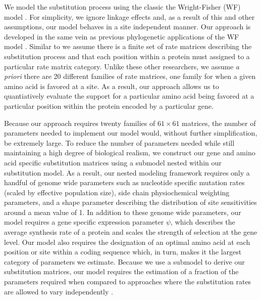\documentclass{article}
\begin{document}
We model the substitution process using the classic the Wright-Fisher (WF) model \citep{Kimura1962,Wright1969,Iwasa1988,BergAndLassig2003,SellaAndHirsh2005}.
For simplicity, we ignore linkage effects and, as a result of this and other assumptions, our model behaves in a site independent manner.
Our approach is developed in the same vein as previous phylogenetic applications of the WF model \citep[e.g.][]{MuseAndGaut1994,HalpernAndBruno1998,YangAndNielsen2008,RodrigueEtAl2005,KoshiAndGoldstein1997,KoshiEtAl1999,DimmicEtAl2000,ThorneEtAl2012,LartillotAndPhilippe2004,RodrigueAndLartillot2014}.
Similar to \citet{LartillotAndPhilippe2004,RodrigueAndLartillot2014} we assume there is a finite set of rate matrices describing the substitution process and that each position within a protein must assigned to a particular rate matrix category.
Unlike these other researchers, we assume \emph{a priori} there are 20 different families of rate matrices, one family for when a given amino acid is favored at a site.
As a result, our approach allows us to quantiatively evaluate the support for a particular amino acid being favored at a particular position within the protein encoded by a particular gene.

Because our approach requires twenty families of $61 \times 61$ matrices, the number of parameters needed to implement our model would, without further simplification, be extremely large.
To reduce the number of parameters needed while still maintaining a high degree of biological realism, we construct our gene and amino acid specific substitution matrices using a submodel nested within our substitution model.
As a result, our nested modeling framework requires only a handful of genome wide parameters such as nucleotide specific mutation rates (scaled by effective population size), side chain physiochemical weighting parameters, and a shape parameter describing the distribution of site sensitivities around a mean value of 1.
In addition to these genome wide parameters, our model requires a gene specific expression parameter $\psi$, which describes the average synthesis rate of a protein and scales the strength of selection at the gene level.
Our model also requires the designation of an optimal amino acid at each position or site within a coding sequence which, in turn, makes it the largest category of parameters we estimate.
Because we use a submodel to derive our substitution matrices, our model requires the estimation of a fraction of the parameters required when compared to approaches where the substitution rates are allowed to vary independently  \citep{HalpernAndBruno1998,LartillotAndPhilippe2004,RodrigueAndLartillot2014}.
\end{document}
